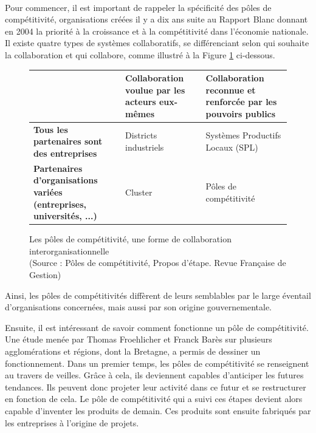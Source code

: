 \documentclass[a4paper,12pt]{report}
\begin{document}
		\paragraph{}Pour commencer, il est important de rappeler la spécificité des pôles de compétitivité, organisations créées il y a dix ans suite au Rapport Blanc donnant en 2004 la priorité à la croissance et à la compétitivité dans l’économie nationale\cite{RapportBlanc}. Il existe quatre types de systèmes collaboratifs, se différenciant selon qui souhaite la collaboration et qui collabore, comme illustré à la Figure  \ref{ComparaisonSystemesCollaboratifs} ci-dessous.
	
		\begin{figure}[!h]		
		
		\vspace{11pt}
		\begin{center}
		\begin{tabular}{|M{110pt}|M{100pt}|M{100pt}|}
			\hline
			& \textbf{Collaboration voulue par les acteurs eux-mêmes} & \textbf{Collaboration reconnue et renforcée par les pouvoirs publics}\\
			\hline
			\textbf{Tous les partenaires sont des entreprises} & Districts industriels & Systèmes Productifs Locaux (SPL)\\
			\hline
			\textbf{Partenaires d'organisations variées (entreprises, universités, ...)} & Cluster & Pôles de compétitivité\\
			\hline
		\end{tabular}
		
		\caption{Les pôles de compétitivité, une forme de collaboration interorganisationnelle \\(Source : Pôles de compétitivité, Propos d'étape. Revue Française de Gestion\cite{PoleCompetitivite})}
		
		\label{ComparaisonSystemesCollaboratifs}
		\end{center}
		\end{figure}
		
		Ainsi, les pôles de compétitivités diffèrent de leurs semblables par le large éventail d’organisations concernées, mais aussi par son origine gouvernementale.

		Ensuite, il est intéressant de savoir comment fonctionne un pôle de compétitivité. Une étude menée par Thomas Froehlicher et Franck Barès sur plusieurs agglomérations et régions, dont la Bretagne, a permis de dessiner un fonctionnement\cite{PolesCompetitiviteClusters}. Dans un premier temps, les pôles de compétitivité se renseignent au travers de veilles. Grâce à cela, ils deviennent capables d’anticiper les futures tendances. Ils peuvent donc projeter leur activité dans ce futur et se restructurer en fonction de cela. Le pôle de compétitivité qui a suivi ces étapes devient alors capable d’inventer les produits de demain. Ces produits sont ensuite fabriqués par les entreprises à l’origine de projets.
\end{document}

